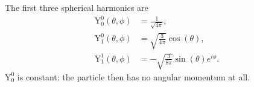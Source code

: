 The first three spherical harmonics are
\begin{align}
	\text{Y}^0_0(\theta,\phi) &= \frac{1}{\sqrt{4\pi}}, \\
	\text{Y}^0_1(\theta,\phi) &= \sqrt{\frac{3}{4\pi}}\cos(\theta), \\
	\text{Y}^1_1(\theta,\phi) &= -\sqrt{\frac{3}{8\pi}}\sin(\theta)e^{i\phi}.
\end{align}
$\text{Y}^0_0$ is constant: the particle then has no angular momentum at all.
